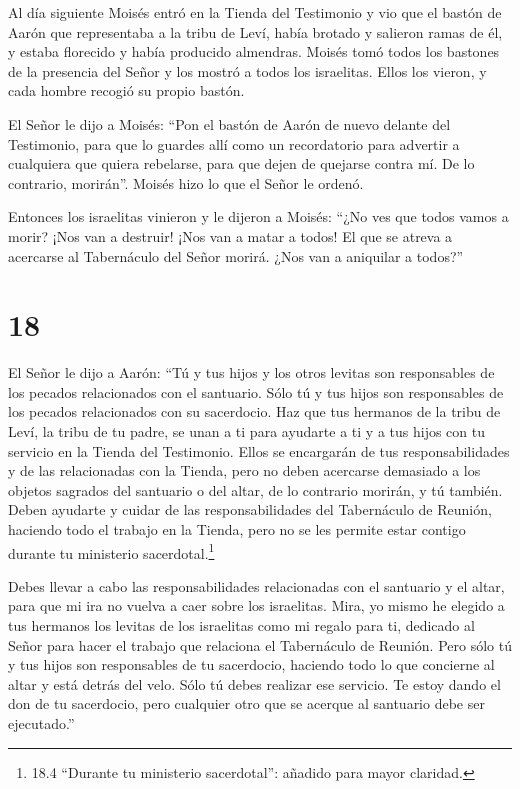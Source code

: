  Al día siguiente Moisés entró en la Tienda del Testimonio y
vio que el bastón de Aarón que representaba a la tribu de Leví, había
brotado y salieron ramas de él, y estaba florecido y había producido
almendras.  Moisés tomó todos los bastones de la presencia
del Señor y los mostró a todos los israelitas. Ellos los vieron, y cada
hombre recogió su propio bastón.

 El Señor le dijo a Moisés: ``Pon el bastón de Aarón de
nuevo delante del Testimonio, para que lo guardes allí como un
recordatorio para advertir a cualquiera que quiera rebelarse, para que
dejen de quejarse contra mí. De lo contrario, morirán''. 
Moisés hizo lo que el Señor le ordenó.

 Entonces los israelitas vinieron y le dijeron a Moisés:
``¿No ves que todos vamos a morir? ¡Nos van a destruir! ¡Nos van a matar
a todos!  El que se atreva a acercarse al Tabernáculo del
Señor morirá. ¿Nos van a aniquilar a todos?''

\hypertarget{section-17}{%
\section{18}\label{section-17}}

 El Señor le dijo a Aarón: ``Tú y tus hijos y los otros
levitas son responsables de los pecados relacionados con el santuario.
Sólo tú y tus hijos son responsables de los pecados relacionados con su
sacerdocio.  Haz que tus hermanos de la tribu de Leví, la
tribu de tu padre, se unan a ti para ayudarte a ti y a tus hijos con tu
servicio en la Tienda del Testimonio.  Ellos se encargarán
de tus responsabilidades y de las relacionadas con la Tienda, pero no
deben acercarse demasiado a los objetos sagrados del santuario o del
altar, de lo contrario morirán, y tú también.  Deben
ayudarte y cuidar de las responsabilidades del Tabernáculo de Reunión,
haciendo todo el trabajo en la Tienda, pero no se les permite estar
contigo durante tu ministerio sacerdotal.\footnote{18.4 ``Durante tu
  ministerio sacerdotal'': añadido para mayor claridad.}

 Debes llevar a cabo las responsabilidades relacionadas con
el santuario y el altar, para que mi ira no vuelva a caer sobre los
israelitas.  Mira, yo mismo he elegido a tus hermanos los
levitas de los israelitas como mi regalo para ti, dedicado al Señor para
hacer el trabajo que relaciona el Tabernáculo de Reunión. 
Pero sólo tú y tus hijos son responsables de tu sacerdocio, haciendo
todo lo que concierne al altar y está detrás del velo. Sólo tú debes
realizar ese servicio. Te estoy dando el don de tu sacerdocio, pero
cualquier otro que se acerque al santuario debe ser ejecutado.''

